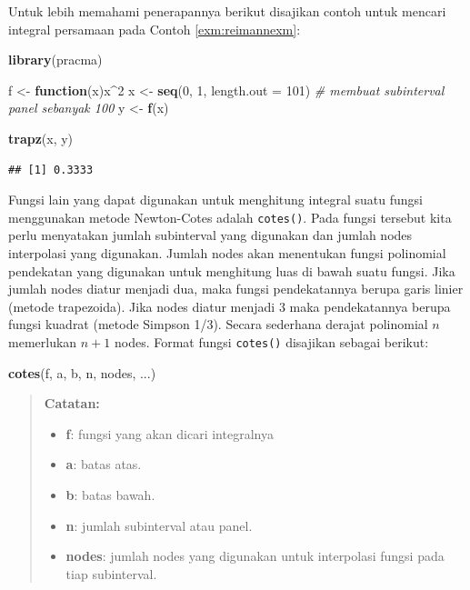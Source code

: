 \documentclass[
]{book}
\newenvironment{Shaded}{\begin{snugshade}}{\end{snugshade}}
\newcommand{\AttributeTok}[1]{\textcolor[rgb]{0.13,0.29,0.53}{#1}}
\newcommand{\CommentTok}[1]{\textcolor[rgb]{0.56,0.35,0.01}{\textit{#1}}}
\newcommand{\ControlFlowTok}[1]{\textcolor[rgb]{0.13,0.29,0.53}{\textbf{#1}}}
\newcommand{\DecValTok}[1]{\textcolor[rgb]{0.00,0.00,0.81}{#1}}
\newcommand{\FunctionTok}[1]{\textcolor[rgb]{0.13,0.29,0.53}{\textbf{#1}}}
\newcommand{\NormalTok}[1]{#1}
\newcommand{\OtherTok}[1]{\textcolor[rgb]{0.56,0.35,0.01}{#1}}
\newcommand{\SpecialCharTok}[1]{\textcolor[rgb]{0.81,0.36,0.00}{\textbf{#1}}}
\providecommand{\tightlist}{%
  \setlength{\itemsep}{0pt}\setlength{\parskip}{0pt}}
\theoremstyle{definition}
\theoremstyle{definition}
\theoremstyle{definition}
\theoremstyle{definition}
\theoremstyle{remark}
\begin{document}
Untuk lebih memahami penerapannya berikut disajikan contoh untuk mencari integral persamaan pada Contoh \ref{exm:reimannexm}:

\begin{Shaded}
\begin{Highlighting}[]
\FunctionTok{library}\NormalTok{(pracma)}

\NormalTok{f }\OtherTok{\textless{}{-}} \ControlFlowTok{function}\NormalTok{(x)x}\SpecialCharTok{\^{}}\DecValTok{2}
\NormalTok{x }\OtherTok{\textless{}{-}} \FunctionTok{seq}\NormalTok{(}\DecValTok{0}\NormalTok{, }\DecValTok{1}\NormalTok{, }\AttributeTok{length.out =} \DecValTok{101}\NormalTok{) }\CommentTok{\# membuat subinterval panel sebanyak 100}
\NormalTok{y }\OtherTok{\textless{}{-}} \FunctionTok{f}\NormalTok{(x)}

\FunctionTok{trapz}\NormalTok{(x, y)}
\end{Highlighting}
\end{Shaded}

\begin{verbatim}
## [1] 0.3333
\end{verbatim}

Fungsi lain yang dapat digunakan untuk menghitung integral suatu fungsi menggunakan metode Newton-Cotes adalah \texttt{cotes()}. Pada fungsi tersebut kita perlu menyatakan jumlah subinterval yang digunakan dan jumlah nodes interpolasi yang digunakan. Jumlah nodes akan menentukan fungsi polinomial pendekatan yang digunakan untuk menghitung luas di bawah suatu fungsi. Jika jumlah nodes diatur menjadi dua, maka fungsi pendekatannya berupa garis linier (metode trapezoida). Jika nodes diatur menjadi 3 maka pendekatannya berupa fungsi kuadrat (metode Simpson 1/3). Secara sederhana derajat polinomial \(n\) memerlukan \(n+1\) nodes. Format fungsi \texttt{cotes()} disajikan sebagai berikut:

\begin{Shaded}
\begin{Highlighting}[]
\FunctionTok{cotes}\NormalTok{(f, a, b, n, nodes, ...)}
\end{Highlighting}
\end{Shaded}

\begin{quote}
\textbf{Catatan:}

\begin{itemize}
\tightlist
\item
  \textbf{f}: fungsi yang akan dicari integralnya
\item
  \textbf{a}: batas atas.
\item
  \textbf{b}: batas bawah.
\item
  \textbf{n}: jumlah subinterval atau panel.
\item
  \textbf{nodes}: jumlah nodes yang digunakan untuk interpolasi fungsi pada tiap subinterval.
\end{itemize}
\end{quote}
\end{document}
